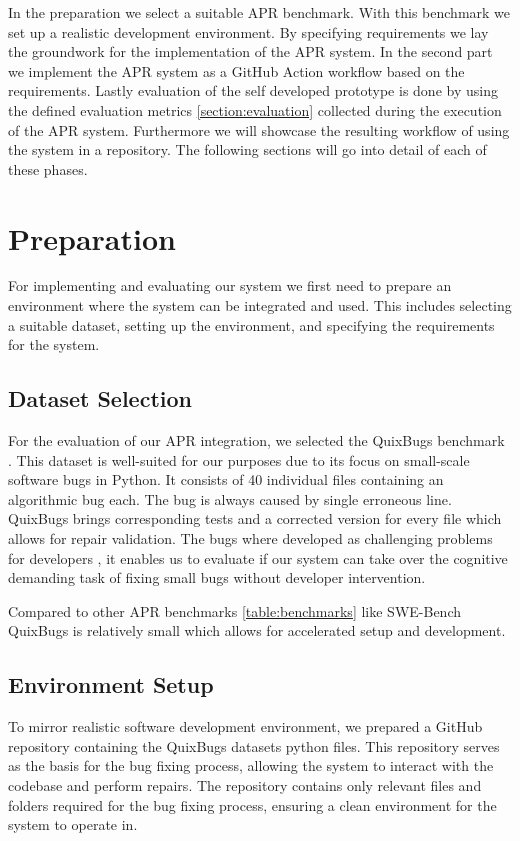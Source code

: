 In the preparation we select a suitable APR benchmark. With this benchmark we set up a realistic development environment. By specifying requirements we lay the groundwork for the implementation of the APR system.
In the second part we implement the APR system as a GitHub Action workflow based on the requirements.
Lastly evaluation of the self developed prototype is done by using the defined evaluation metrics \ref{section:evaluation} collected during the execution of the APR system. Furthermore we will showcase the resulting workflow of using the system in a repository.
The following sections will go into detail of each of these phases.

\section{Preparation}
For implementing and evaluating our system we first need to prepare an environment where the system can be integrated and used. This includes selecting a suitable dataset, setting up the environment, and specifying the requirements for the system.
\subsection{Dataset Selection}
For the evaluation of our APR integration, we selected the QuixBugs benchmark \cite{linQuixBugsMultilingualProgram2017}. This dataset is well-suited for our purposes due to its focus on small-scale software bugs in Python. It consists of 40 individual files containing an algorithmic bug each. The bug is always caused by single erroneous line. QuixBugs brings corresponding tests and a corrected version for every file which allows for repair validation. The bugs where developed as challenging problems for developers \cite{linQuixBugsMultilingualProgram2017}, it enables us to evaluate if our system can take over the cognitive demanding task of fixing small bugs without developer intervention.

Compared to other APR benchmarks \ref{table:benchmarks} like SWE-Bench \cite{jimenezSWEbenchCanLanguage2024} QuixBugs is relatively small which allows for accelerated setup and development.

\subsection{Environment Setup}
To mirror realistic software development environment, we prepared a GitHub repository containing the QuixBugs datasets python files. This repository serves as the basis for the bug fixing process, allowing the system to interact with the codebase and perform repairs. The repository contains only relevant files and folders required for the bug fixing process, ensuring a clean environment for the system to operate in.

